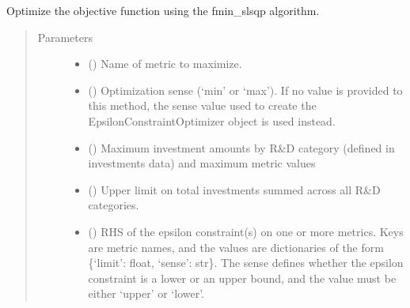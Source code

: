 \documentclass[letterpaper,10pt,english]{sphinxmanual}
\begin{document}
\begin{fulllineitems}
\begin{fulllineitems}
\begin{quote}
\begin{description}
\begin{itemize}
\end{itemize}

\end{description}\end{quote}

\end{fulllineitems}


\begin{fulllineitems}
\label{\detokenize{tyche:tyche.EpsilonConstraints.EpsilonConstraintOptimizer.opt_slsqp}}
Optimize the objective function using the fmin\_slsqp algorithm.
\begin{quote}\begin{description}
\item[{Parameters}] \leavevmode\begin{itemize}
\item {} 
 () \textendash{} Name of metric to maximize.

\item {} 
 () \textendash{} Optimization sense (‘min’ or ‘max’). If no value is provided to
this method, the sense value used to create the
EpsilonConstraintOptimizer object is used instead.

\item {} 
 () \textendash{} Maximum investment amounts by R\&D category (defined in investments data)
and maximum metric values

\item {} 
 () \textendash{} Upper limit on total investments summed across all R\&D categories.

\item {} 
 () \textendash{} RHS of the epsilon constraint(s) on one or more metrics. Keys are metric
names, and the values are dictionaries of the form
\{‘limit’: float, ‘sense’: str\}. The sense defines whether the epsilon
constraint is a lower or an upper bound, and the value must be either
‘upper’ or ‘lower’.


\end{itemize}
\end{description}
\end{quote}
\end{fulllineitems}
\end{fulllineitems}
\end{document}
